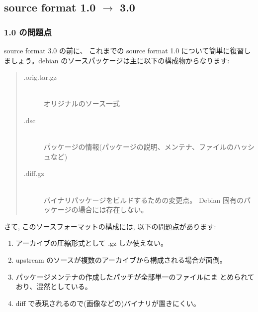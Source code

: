 \documentclass[mingoth,a4paper]{jsarticle}
\begin{document}
\subsection{source format 1.0 $\to$ 3.0 }

\subsubsection{1.0 の問題点}

source format 3.0 の前に、
これまでの source format 1.0 について簡単に復習しましょう。debian のソースパッケージは主に以下の構成物からなります:
\begin{quote}
    \begin{screen}
        \begin{description}
              \item[.orig.tar.gz] 　\\
            オリジナルのソース一式
              \item[.dsc]　\\
            パッケージの情報(パッケージの説明、メンテナ、ファイルのハッシュなど)
              \item[.diff.gz]　\\
            バイナリパッケージをビルドするための変更点。
            Debian 固有のパッケージの場合には存在しない。
        \end{description}
    \end{screen}
\end{quote}

さて, このソースフォーマットの構成には, 以下の問題点があります:
\begin{enumerate}
      \item アーカイブの圧縮形式として .gz  しか使えない。
      \item upstream のソースが複数のアーカイブから構成される場合が面倒。
      \item パッケージメンテナの作成したパッチが全部単一のファイルにま
    とめられており、混然としている。
      \item diff で表現されるので(画像などの)バイナリが置きにくい。
\end{enumerate}
\end{document}

